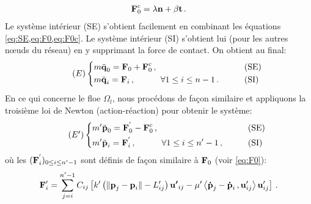 \begin{align}  \label{eq:F0c}
    \bm{\mathrm{F}}_0^c = \lambda \bm{\mathrm{n}} + \beta \bm{\mathrm{t}} \,.
\end{align}
Le système intérieur (SE) s'obtient facilement en combinant les équations \cref{eq:SE,eq:F0,eq:F0c}. Le système intérieur (SI) s'obtient lui (pour les autres n\oe{}uds du réseau) en y supprimant la force de contact. On obtient au final:
\begin{align} \tag{$E$} \label{eq:e}
\begin{dcases}
    m \ddot{\bm{\mathrm{q}}}_0 = \bm{\mathrm{F}}_0 + \bm{\mathrm{F}}^c_0  \,, &\qquad \text{(SE)} \\
    m \ddot{\bm{\mathrm{q}}}_i = \bm{\mathrm{F}}_i   \,, \quad \quad \quad \forall 1 \leq i \leq n-1 \,. &\qquad \text{(SI)}
\end{dcases}
\end{align}
En ce qui concerne le floe $\Omega_l$, nous procédons de façon similaire et appliquons la troisième loi de Newton (action-réaction) pour obtenir le système:
\begin{align} \tag{$E'$} \label{eq:eprime}
\begin{dcases}
    m' \ddot{\bm{\mathrm{p}}}_0 = \bm{\mathrm{F}}^{'}_0 - \bm{\mathrm{F}}^c_0  \,, &\qquad \text{(SE)} \\
    m' \ddot{\bm{\mathrm{p}}}_i = \bm{\mathrm{F}}^{'}_i   \,, \quad \quad \quad \forall 1 \leq i \leq n'-1 \,, &\qquad \text{(SI)}
\end{dcases}
\end{align}
où les $(\bm{\mathrm{F}}^{'}_i)_{0 \leq i \leq n'-1}$ sont définis de façon similaire à $\bm{\mathrm{F}}_0$ (voir \cref{eq:F0}):
\begin{align}
    \bm{\mathrm{F}}'_i = \sum_{j=i}^{n'-1}C_{ij} \left[ k' \left( \Vert \bm{\mathrm{p}}_j - \bm{\mathrm{p}}_i \Vert - L'_{ij} \right) \bm{\mathrm{u'}}_{ij} - \mu' \left\langle \bm{\mathrm{\dot{p}}}_j - \bm{\mathrm{\dot{p}}}_i\,, \bm{\mathrm{u}}'_{ij}  \right\rangle  \bm{\mathrm{u}}'_{ij}  \right] \,.
\end{align}

